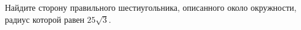 \begin{ex}
	\begin{condition}
		Найдите сторону правильного шестиугольника, описанного около окружности, радиус которой равен \( 25\sqrt{3} \).
	\end{condition}
\end{ex}